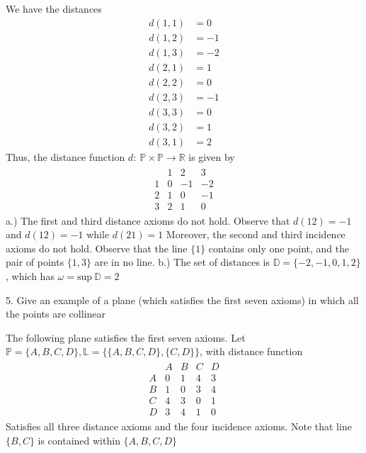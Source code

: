 \documentclass{report}
\begin{document}
    \bigbreak \noindent 
    We have the distances
    \begin{align*}
        d(1,1) &= 0 \\
        d(1,2) &= -1 \\
        d(1,3) &= -2 \\
        d(2,1) &= 1 \\
        d(2,2) &= 0 \\
        d(2,3) &= -1 \\
        d(3,3) &= 0 \\
        d(3,2) &= 1 \\
        d(3,1) &= 2
    \end{align*}
    Thus, the distance function $d:\ \mathbb{P} \times \mathbb{P} \to \mathbb{R}$ is given by 
    \begin{align*}
        \begin{array}{c|ccc}
           &1&2&3 \\
           \hline
            1 & 0 & -1 &  -2\\
            2 & 1 & 0 & - 1\\
            3& 2 & 1 & 0
        \end{array}
    \end{align*}
    \bigbreak \noindent 
    a.) The first and third distance axioms do not hold. Observe that $d(12) = -1$ and $d(12) = -1$ while $d(21) =1$
    \bigbreak \noindent 
    Moreover, the second and third incidence axioms do not hold. Observe that the line $\{1\}$ contains only one point, and the pair of points $\{1,3\} $ are in no line.
    \bigbreak \noindent 
    b.) The set of distances is $\mathbb{D} = \{-2,-1,0,1,2\}$, which has $\omega = \text{sup}\ \mathbb{D} = 2$

    

    \bigbreak \noindent 
    \begin{mdframed}
        5. Give an example of a plane (which satisfies the first seven axioms) in which all the points are collinear
    \end{mdframed}
    \bigbreak \noindent 
    The following plane satisfies the first seven axioms. Let $\mathbb{P} = \{A,B,C,D\}, \mathbb{L} = \{\{A,B,C,D\}, \{C,D\}\}$, with distance function
    \begin{align*}
        \begin{array}{c|cccc}
          &A&B&C&D \\
            A&0&1&4&3 \\
            B& 1&0&3&4\\
            C& 4&3&0&1\\
            D& 3&4&1&0 
       \end{array}
    \end{align*}
    Satisfies all three distance axioms and the four incidence axioms. Note that line $\{B,C\}$ is contained within $\{A,B,C,D\} $
\end{document}
